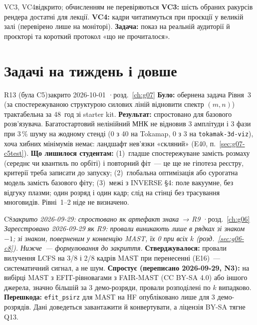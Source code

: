 \begin{itemcard}{VC3, VC4}{відкрито; обчисленням не перевіряються}
\textbf{VC3:} шість обраних ракурсів рендера достатні для лекції. \textbf{VC4:} кадри
читатимуться при проєкції у великій залі (перевірено лише на моніторі). \textbf{Задача:} показ
на реальній аудиторії й проєкторі та короткий протокол «що не прочиталося».
\end{itemcard}

\section{Задачі на тиждень і довше}\label{sec:g10-week}

\begin{itemcard}{R13 (була C5)}{закрито 2026-10-01 \quad·\quad розд.~\ref{ch:g07}}
\textbf{Було:} обернена задача Рівня~3 (за спостережуваною структурою силових ліній відновити
спектр $(m,n)$) трактабельна за 48~год зі starter kit. \textbf{Результат:} спростовано для
базового розв'язувача. Багатостартовий нелінійний МНК не відновив 3 амплітуди і 3 фази при
3\,\% шуму на жодному стенді (0 з 40 на Tokamap, 0 з 3 на \texttt{tokamak-3d-viz}), хоча хибних
мінімумів немає: ландшафт нев'язки «скляний» (E40, п.~\ref{sec:g07-c5test}). \textbf{Що лишилося
студентам:} (1)~гладше спостережуване замість розмаху (середнє чи квантиль по орбіті) і повторний
фіт~--- це ще не гіпотеза реєстру, критерії треба записати до запуску; (2)~глобальна оптимізація
або сурогатна модель замість базового фіту; (3)~межі з INVERSE §4: поле вакуумне, без відгуку
плазми; один розряд і один кадр; слід на стінці без трасування многовидів. Рівні~1--2 ніде не
визначено.
\end{itemcard}

\begin{itemcard}{C8}{\emph{закрито 2026-09-29: спростовано як артефакт знака~→ R9} \quad·\quad розд.~\ref{ch:g06}}
\emph{Зареєстровано 2026-09-29 як R9: провали виникають лише в рядках зі знаком $-1$; зі знаком, поверненим у конвенцію MAST, їх 0 при всіх $k$ (розд.~\ref{sec:g06-c8}). Нижче~--- формулювання до закриття.}
\textbf{Стверджувалося:} провали вилучення LCFS на 3/8 і 2/8 кадрів MAST при перенесенні (E16)~---
систематичний сигнал, а не шум. \textbf{Спростує (переписано 2026-09-29, N3):} на вибірці MAST з
EFIT-рівновагами з FAIR-MAST (CC BY-SA 4.0) або іншого джерела, значно більшій за 3 демо-розряди,
провали розподілені по $k$ випадково. \textbf{Перешкода:} \texttt{efit\_psirz} для MAST на HF
опубліковано лише для 3 демо-розрядів. Дані доведеться завантажити й конвертувати, а ліцензія
BY-SA тягне Q13.
\end{itemcard}

